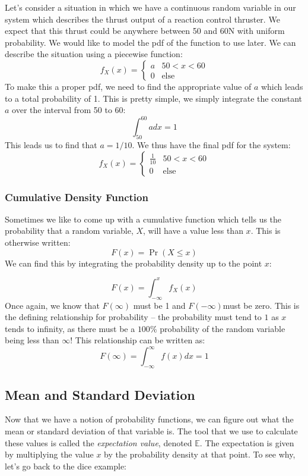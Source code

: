 \begin{example}
Let's consider a situation in which we have a continuous random variable in our system which describes the thrust output of a reaction control thruster. We expect that this thrust could be anywhere between 50 and 60N with uniform probability. We would like to model the \gls{pdf} of the function to use later. We can describe the situation using a piecewise function:
$$f_X(x)=\begin{cases}
a&50<x<60\\
0&\text{else}
\end{cases}$$
To make this a proper \gls{pdf}, we need to find the appropriate value of $a$ which leads to a total probability of 1. This is pretty simple, we simply integrate the constant $a$ over the interval from 50 to 60:
$$\int_{50}^{60}adx=1$$
This leads us to find that $a=1/10$. We thus have the final \gls{pdf} for the system:
$$f_X(x)=\begin{cases}
\frac{1}{10}&50<x<60\\
0&\text{else}
\end{cases}$$
\end{example}

\subsubsection{Cumulative Density Function}
Sometimes we like to come up with a cumulative function which tells us the probability that a random variable, $X$, will have a value less than $x$. This is otherwise written:
$$F(x)=\Pr(X\leq x)$$
We can find this by integrating the probability density up to the point $x$:

$$F(x)=\int_{-\infty}^x{f_X(x)}$$
Once again, we know that $F(\infty)$ must be 1 and $F(-\infty)$must be zero. This is the defining relationship for probability -- the probability must tend to $1$ as $x$ tends to infinity, as there must be a $100\%$ probability of the random variable being less than $\infty$! This relationship can be written as:
$$F(\infty)=\int_{-\infty}^\infty{f(x)dx}=1$$

\subsection{Mean and Standard Deviation}

Now that we have a notion of probability functions, we can figure out what the mean or standard deviation of that variable is. The tool that we use to calculate these values is called the \textit{expectation value}, denoted $\mathbb{E}$. The expectation is given by multiplying the value $x$ by the probability density at that point. To see why, let's go back to the dice example:


